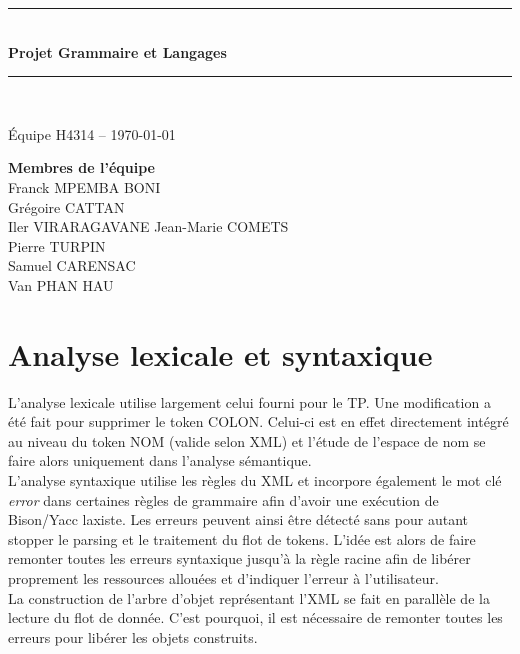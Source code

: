 \documentclass[10pt, a4paper]{article}
\newcommand{\HRule}{\rule{\linewidth}{0.5mm}}
\begin{document}
\begin{titlepage}
    \vspace*{\fill}
    \centering
    \HRule \\[0.4cm]
    {\huge \bfseries Projet Grammaire et Langages}
    \HRule \\[1.5cm]

    \begin{minipage}{0.8\textwidth}
        \centering
        \large
        Équipe H4314 -- \today
    \end{minipage}

    \vfill

    \flushleft
    \small
    {\bfseries Membres de l'équipe} \\
    Franck MPEMBA BONI \\
    Grégoire CATTAN \\
    Iler VIRARAGAVANE
    Jean-Marie COMETS \\
    Pierre TURPIN \\
    Samuel CARENSAC \\
    Van PHAN HAU \\
\end{titlepage}

\tableofcontents
\newpage

\section{Analyse lexicale et
syntaxique}\label{analyse-lexicale-et-syntaxique}

L'analyse lexicale utilise largement celui fourni pour le TP. Une
modification a été fait pour supprimer le token COLON. Celui-ci est en
effet directement intégré au niveau du token NOM (valide selon XML) et
l'étude de l'espace de nom se faire alors uniquement dans l'analyse
sémantique. \\

L'analyse syntaxique utilise les règles du XML et incorpore également le
mot clé \emph{error} dans certaines règles de grammaire afin d'avoir une
exécution de Bison/Yacc laxiste. Les erreurs peuvent ainsi être détecté
sans pour autant stopper le parsing et le traitement du flot de tokens.
L'idée est alors de faire remonter toutes les erreurs syntaxique jusqu'à
la règle racine afin de libérer proprement les ressources allouées et
d'indiquer l'erreur à l'utilisateur. \\

La construction de l'arbre d'objet représentant l'XML se fait en
parallèle de la lecture du flot de donnée. C'est pourquoi, il est
nécessaire de remonter toutes les erreurs pour libérer les objets
construits.
\end{document}
